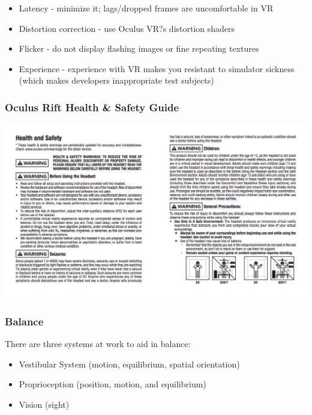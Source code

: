 \begin{frame}
	\begin{itemize}
		\item Latency - minimize it; lags/dropped frames are uncomfortable in VR
		\item Distortion correction - use Oculus VR?s distortion shaders
		\item Flicker - do not display flashing images or fine repeating textures
		\item Experience - experience with VR makes you resistant to simulator sickness (which makes developers inappropriate test subjects)
	\end{itemize}
\end{frame}

\begin{frame}

	\begin{center}
		\frametitle{Oculus Rift Health \& Safety Guide}
		\href{https://static.oculus.com/documents/310-30023-01_Rift_HealthSafety_English.pdf}{ \includegraphics[scale=.45]{assets/sideeffects}  }
	\end{center}

\end{frame}

\begin{frame}
	\frametitle{Balance}
	There are three systems at work to aid in balance:
	
	\begin{itemize}
		\item Vestibular System (motion, equilibrium, spatial orientation)
		\item Proprioception (position, motion, and equilibrium)
		\item Vision (sight)
	\end{itemize}
			
\end{frame}

